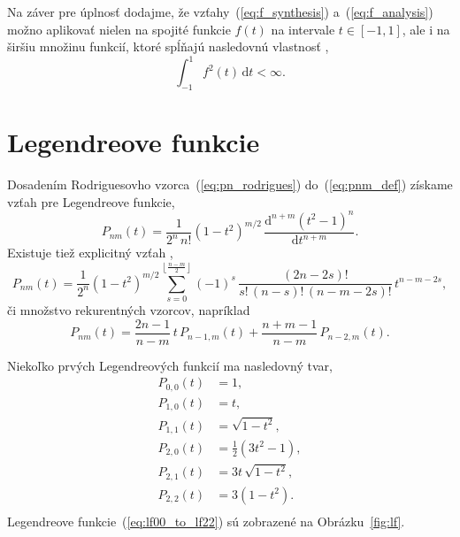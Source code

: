 \documentclass[a4paper, 12pt]{book}
\newcommand{\diff}{\mathrm d}
\begin{document}
Na záver pre úplnosť dodajme, že vzťahy~(\ref{eq:f_synthesis}) 
a~(\ref{eq:f_analysis}) možno aplikovať nielen na spojité funkcie $f(t)$ na 
intervale $t \in [-1, 1]$, ale i na širšiu množinu funkcií, ktoré spĺňajú 
nasledovnú vlastnosť \citep{Freeden2009},
%
\begin{equation}
\int_{-1}^{1} f^2(t) \, \diff t < \infty{.}
\end{equation}






\section{Legendreove funkcie}
\label{sec:legendre_functions}

Dosadením Rodriguesovho vzorca~(\ref{eq:pn_rodrigues}) do~(\ref{eq:pnm_def}) 
získame vzťah pre Legendreove funkcie,
%
\begin{equation}
P_{nm}(t) = \frac{1}{2^n \, n!} (1 - t^2)^{ m \slash 2} \, \frac{\diff^{n + m} 
(t^2 - 1)^n}{\diff t^{n + m}}{.}
\end{equation}
%
Existuje tiež explicitný vzťah \citep{Freeden2009},
%
\begin{equation}
P_{nm}(t) = \frac{1}{2^n}(1 - t^2)^{m \slash 2} \sum_{s = 0}^{\left\lfloor 
\frac{n - m}{2} \right\rfloor} (-1)^s \, \frac{(2n - 2s)!}{s! \, (n - s)! \, (n 
- m - 2s)!} \, t^{n - m - 2s}{,}
\end{equation}
%
či
%
množstvo rekurentných vzorcov, napríklad \citep{Freeden2009}
%
\begin{equation}
P_{nm}(t) = \frac{2n - 1}{n - m} \, t \, P_{n - 1, m}(t) + \frac{n + m - 1}{n 
- m} \, P_{n - 2, m}(t){.}
\end{equation}

Niekoľko prvých Legendreových funkcií ma nasledovný tvar,
%
\begin{equation}
\label{eq:lf00_to_lf22}
\begin{split}
P_{0,0}(t) & = 1{,}\\
P_{1,0}(t) & = t{,}\\
P_{1,1}(t) & = \sqrt{1 - t^2}{,}\\
P_{2,0}(t) & = \frac{1}{2}(3t^2 - 1){,}\\
P_{2,1}(t) & = 3t \, \sqrt{1 - t^2}{,}\\
P_{2,2}(t) & = 3(1 - t^2){.}\\
\end{split}
\end{equation}
%
Legendreove funkcie~(\ref{eq:lf00_to_lf22}) sú zobrazené na 
Obrázku~\ref{fig:lf}.
\end{document}
